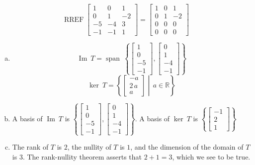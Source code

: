 \begin{exerciseAnswer} 


\[\operatorname{RREF} \left[\begin{array}{ccc}
1 & 0 & 1 \\
0 & 1 & -2 \\
-5 & -4 & 3 \\
-1 & -1 & 1
\end{array}\right] = \left[\begin{array}{ccc}
1 & 0 & 1 \\
0 & 1 & -2 \\
0 & 0 & 0 \\
0 & 0 & 0
\end{array}\right] \]


\begin{enumerate}[(a)]
\item \[\operatorname{Im}\ T = \operatorname{span}\  \left\{ \left[\begin{array}{c}
1 \\
0 \\
-5 \\
-1
\end{array}\right] , \left[\begin{array}{c}
0 \\
1 \\
-4 \\
-1
\end{array}\right] \right\} \]\[\operatorname{ker}\ T =  \left\{ \left[\begin{array}{c}
-a \\
2 \, a \\
a
\end{array}\right] \middle|\,a\in\mathbb{R}\right\} \]
\item  A basis of \(\operatorname{Im}\ T\) is \( \left\{ \left[\begin{array}{c}
1 \\
0 \\
-5 \\
-1
\end{array}\right] , \left[\begin{array}{c}
0 \\
1 \\
-4 \\
-1
\end{array}\right] \right\} \). A basis of \(\operatorname{ker}\ T\) is \( \left\{ \left[\begin{array}{c}
-1 \\
2 \\
1
\end{array}\right] \right\} \)
\item  The rank of \(T\) is \( 2 \), the nullity of \(T\) is \( 1 \), and the dimension of the domain of \(T\) is \( 3 \). The rank-nullity theorem asserts that \( 2 + 1 = 3 \), which we see to be true. 
\end{enumerate}
    
\end{exerciseAnswer}
    
